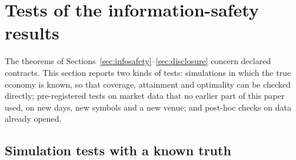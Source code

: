 \FloatBarrier
\section{Tests of the information-safety results}\label{sec:istests}

The theorems of Sections~\ref{sec:infosafety}--\ref{sec:disclosure} concern declared contracts. This section reports two kinds of tests: simulations in which the true economy is known, so that coverage, attainment and optimality can be checked directly; pre-registered tests on market data that no earlier part of this paper used, on new days, new symbols and a new venue; and post-hoc checks on data already opened.

\subsection{Simulation tests with a known truth}\label{sec:simtests}

